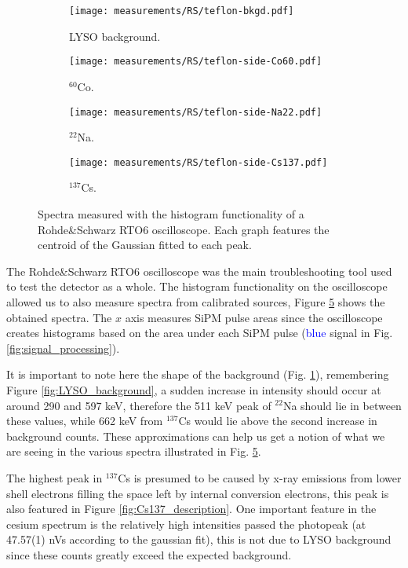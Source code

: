 \begin{figure}[H]
  \begin{subfigure}[t]{0.48\textwidth}
    \centering
    \texttt{[image: measurements/RS/teflon-bkgd.pdf]}
    \caption{\label{sfig:RS_bkgd}LYSO background.}
  \end{subfigure}
  \hfill
  \begin{subfigure}[t]{0.48\textwidth}
    \centering
    \texttt{[image: measurements/RS/teflon-side-Co60.pdf]}
    \caption{\label{sfig:RS_60Co}$^{60}$Co.}
  \end{subfigure}
  \medskip
  \begin{subfigure}[t]{0.48\textwidth}
    \centering
    \texttt{[image: measurements/RS/teflon-side-Na22.pdf]}
    \caption{\label{sfig:RS_22Na}$^{22}$Na.}
  \end{subfigure}
  \hfill
  \begin{subfigure}[t]{0.48\textwidth}
    \centering
    \texttt{[image: measurements/RS/teflon-side-Cs137.pdf]}
    \caption{\label{sfig:RS_137Cs}$^{137}$Cs.}
  \end{subfigure}
  \caption{\label{fig:RS_spectra}Spectra measured with the histogram functionality of a Rohde\&Schwarz RTO6 oscilloscope. Each graph features the centroid of the Gaussian fitted to each peak.}
\end{figure}

The Rohde\&Schwarz RTO6 oscilloscope was the main troubleshooting tool used to test the detector as a whole. The histogram functionality on the oscilloscope allowed us to also measure spectra from calibrated sources, Figure \ref{fig:RS_spectra} shows the obtained spectra. The $x$ axis measures SiPM pulse areas since the oscilloscope creates histograms based on the area under each SiPM pulse (\textcolor{blue}{blue} signal in Fig. \ref{fig:signal_processing}).

It is important to note here the shape of the background (Fig. \ref{sfig:RS_bkgd}), remembering Figure \ref{fig:LYSO_background}, a sudden increase in intensity should occur at around 290 and 597 \unit{\kilo\eV}, therefore the 511 \unit{\kilo\eV} peak of $^{22}$Na should lie in between these values, while 662 \unit{\kilo\eV} from $^{137}$Cs would lie above the second increase in background counts. These approximations can help us get a notion of what we are seeing in the various spectra illustrated in Fig. \ref{fig:RS_spectra}.

The highest peak in $^{137}$Cs is presumed to be caused by x-ray emissions from lower shell electrons filling the space left by internal conversion electrons, this peak is also featured in Figure \ref{fig:Cs137_description}. One important feature in the cesium spectrum is the relatively high intensities passed the photopeak (at 47.57(1) nVs according to the gaussian fit), this is not due to LYSO background since these counts greatly exceed the expected background.

